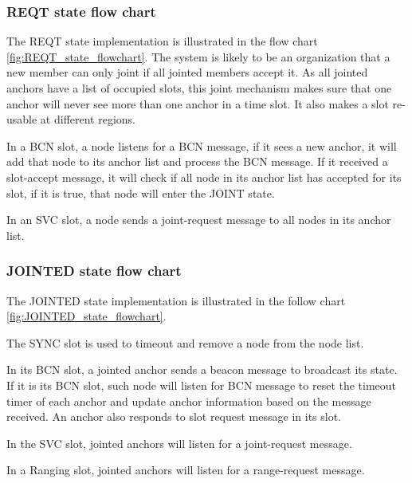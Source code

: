 \documentclass[\main/main.tex]{subfiles}
\begin{document}
\subsubsection{REQT state flow chart}
The REQT state implementation is illustrated in the flow chart \ref{fig:REQT_state_flowchart}. The system is likely to be an  organization that a new member can only joint if all jointed members accept it. As all jointed anchors have a list of occupied slots, this joint mechanism makes sure that one anchor will never see more than one anchor in a time slot. It also makes a slot re-usable at different regions.

In a BCN slot, a node listens for a BCN message, if it sees a new anchor, it will add that node to its anchor list and process the BCN message. If it received a slot-accept message, it will check if all node in its anchor list has accepted for its slot, if it is true, that node will enter the JOINT state.

In an SVC slot, a node sends a joint-request message to all nodes in its anchor list.


\subsubsection{JOINTED state flow chart}
The JOINTED state implementation is illustrated in the follow chart \ref{fig:JOINTED_state_flowchart}.

The SYNC slot is used to timeout and remove a node from the node list.

In its BCN slot, a jointed anchor sends a beacon message to broadcast its state. If it is its BCN slot, such node will listen for BCN message to reset the timeout timer of each anchor and update anchor information based on the message received. An anchor also responds to slot request message in its slot.

In the SVC slot, jointed anchors will listen for a joint-request message.

In a Ranging slot, jointed anchors will listen for a range-request message.
\end{document}
